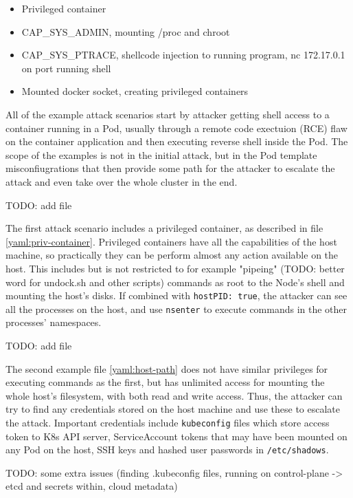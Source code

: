 \documentclass[english, 12pt, a4paper, sci, utf8, a-2b, online]{aaltothesis}
\begin{document}
\begin{itemize}
  \item Privileged container
  \item CAP\_SYS\_ADMIN, mounting /proc and chroot
  \item CAP\_SYS\_PTRACE, shellcode injection to running program, nc 172.17.0.1 on port running shell
  \item Mounted docker socket, creating privileged containers
\end{itemize}

All of the example attack scenarios start by attacker getting shell access to a container running in a Pod, usually through a remote code exectuion (RCE) flaw on the container application and then executing reverse shell inside the Pod. The scope of the examples is not in the initial attack, but in the Pod template misconfiugrations that then provide some path for the attacker to escalate the attack and even take over the whole cluster in the end.

TODO: add file \label{yaml:priv-container}

The first attack scenario includes a privileged container, as described in file \ref{yaml:priv-container}. Privileged containers have all the capabilities of the host machine, so practically they can be perform almost any action available on the host. This includes but is not restricted to for example "pipeing" (TODO: better word for undock.sh and other scripts) commands as root to the Node's shell and mounting the host's disks. If combined with \texttt{hostPID:\ true}, the attacker can see all the processes on the host, and use \texttt{nsenter} to execute commands in the other processes' namespaces.

TODO: add file \label{yaml:host-path}

The second example file \ref{yaml:host-path} does not have similar privileges for executing commands as the first, but has unlimited access for mounting the whole host's filesystem, with both read and write access. Thus, the attacker can try to find any credentials stored on the host machine and use these to escalate the attack. Important credentials include \texttt{kubeconfig} files which store access token to K8s API server, ServiceAccount tokens that may have been mounted on any Pod on the host, SSH keys and hashed user passwords in \texttt{/etc/shadows}.

TODO: some extra issues (finding .kubeconfig files, running on control-plane -> etcd and secrets within, cloud metadata)
\end{document}
